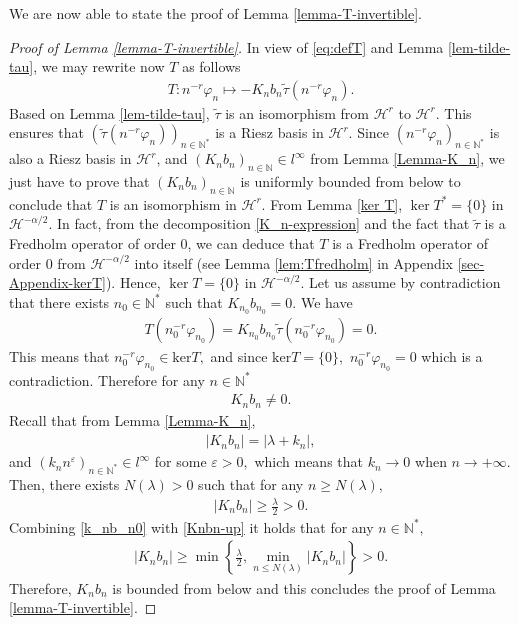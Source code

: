 \documentclass[11pt, dvipsnames]{amsart}
\begin{document}
{\color{black} We are now able to state the proof of Lemma \ref{lemma-T-invertible}.\\
\begin{proof}[Proof of Lemma \ref{lemma-T-invertible}]
In view of \eqref{eq:defT} and Lemma \ref{lem-tilde-tau}, we may rewrite now $T$ as follows
\begin{align*}
    T:n^{-r}\varphi_n\mapsto -K_n b_n \tilde\tau (n^{-r}\varphi_n).
\end{align*}
Based on Lemma \ref{lem-tilde-tau}, $\tilde \tau$ is an isomorphism from $\mathcal{H}^r$ to $\mathcal{H}^r.$ This ensures that $(\tilde{\tau} (n^{-r}\varphi_n))_{n\in \mathbb{N}^*}$ is a Riesz basis in $\mathcal{H}^r.$  Since $(n^{-r}\varphi_n)_{n\in \mathbb{N}^*}$ is also a Riesz basis in $\mathcal{H}^r$, and $(K_n b_n)_{n\in\mathbb{N}}\in l^{\infty}$ from Lemma \ref{Lemma-K_n}, we just have to prove that $(K_n b_n)_{n\in\mathbb{N}}$ is uniformly bounded from below to conclude that 
$T$ is an isomorphism in $\mathcal{H}^r$. 
From Lemma \ref{ker T}, $\ker T^{*}=\{0\}$ in $\mathcal{H}^{-\alpha/2}$. In fact, from the decomposition \eqref{K_n-expression} and the fact that $\tilde{\tau}$ is a Fredholm operator of order 0, we can deduce that $T$ is a Fredholm operator of order 0 from $\mathcal{H}^{-\alpha/2}$ into itself (see Lemma \ref{lem:Tfredholm} in Appendix \ref{sec-Appendix-kerT}). Hence, $\ker T=\{0\}$ in $\mathcal{H}^{-\alpha/2}$.
Let us assume by contradiction that there exists $n_0\in \mathbb{N}^*$ such that $K_{n_0} b_{n_0}=0.$ We have 
\begin{align*}
    T(n_0^{-r}\varphi_{n_0})=K_{n_0}b_{n_0}\tilde \tau (n_0^{-r}\varphi_{n_0})=0.
\end{align*}
This means that $n_0^{-r}\varphi_{n_0}\in \text{ker} T,$ and since $\text{ker} T=\{0\},$  $n_0^{-r}\varphi_{n_0}=0$ which is a contradiction. Therefore for any $n\in \mathbb{N}^*$  
\begin{align}
    K_n b_n\neq 0.\label{k_nb_n0}
\end{align}
Recall that from Lemma \eqref{Lemma-K_n}, 
\begin{align*}
    |K_n b_n|=|\lambda+k_n|,
\end{align*} and $(k_n n^{\varepsilon})_{n\in \mathbb{N}^*}\in l^{\infty}$ for some $\varepsilon>0,$ which means that $k_n\rightarrow 0$ when $n\rightarrow +\infty.$ Then, there exists $N(\lambda)>0$ such that for any $n\geq N(\lambda),$
\begin{align}
    |K_n b_n|\geq \frac{\lambda}{2}>0.\label{Knbn-up}
\end{align}
Combining \eqref{k_nb_n0} with \eqref{Knbn-up} it holds that for any $n\in \mathbb{N}^*,$
\begin{align*}
    |K_n b_n|\geq \min\left\{\frac{\lambda}{2}, \underset{n\leq N(\lambda)}{\min}|K_n b_n|\right\}>0.
\end{align*}
Therefore, $K_n b_n$ is bounded from below and this concludes
the proof of Lemma \ref{lemma-T-invertible}.
\end{proof}
}
\end{document}
